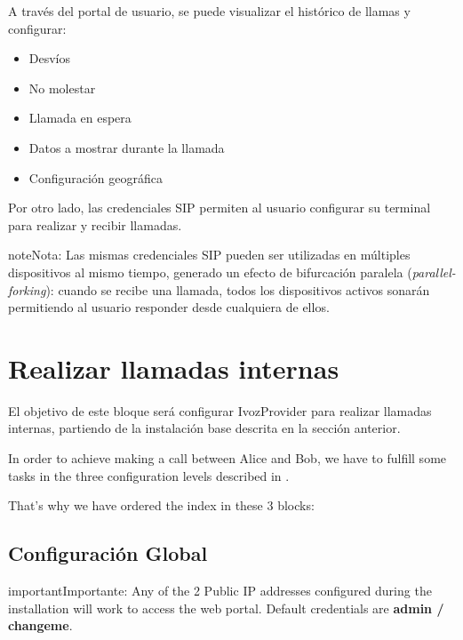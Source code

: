 \documentclass[letterpaper,10pt,spanish]{sphinxmanual}
\begin{document}
A través del portal de usuario, se puede visualizar el histórico de llamas y configurar:
\begin{itemize}
\item {} 
Desvíos

\item {} 
No molestar

\item {} 
Llamada en espera

\item {} 
Datos a mostrar durante la llamada

\item {} 
Configuración geográfica

\end{itemize}

Por otro lado, las credenciales SIP permiten al usuario configurar su terminal para realizar y recibir llamadas.

\begin{notice}{note}{Nota:}
Las mismas credenciales SIP pueden ser utilizadas en múltiples dispositivos al mismo tiempo, generado un efecto de bifurcación paralela (\emph{parallel-forking}): cuando se recibe una llamada, todos los dispositivos activos sonarán permitiendo al usuario responder desde cualquiera de ellos.
\end{notice}


\chapter{Realizar llamadas internas}
\label{getting_started/internal_calls/index:making-internal-calls}\label{getting_started/internal_calls/index::doc}
El objetivo de este bloque será configurar IvozProvider para realizar llamadas internas, partiendo de la instalación base descrita en la sección anterior.

In order to achieve making a call between Alice and Bob, we have to fulfill some tasks in
the three configuration levels described in {\hyperref[basic_concepts/operation_roles/index:operation\string-roles]{}}.

That's why we have ordered the index in these 3 blocks:


\section{Configuración Global}
\label{getting_started/internal_calls/god_portal:global-configuration}\label{getting_started/internal_calls/god_portal::doc}
\begin{notice}{important}{Importante:}
Any of the 2 Public IP addresses configured during the
installation will work to access the web portal. Default credentials are
\textbf{admin / changeme}.
\end{notice}
\end{document}
